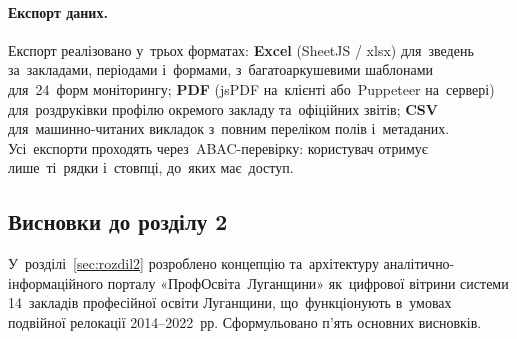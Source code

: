 \paragraph*{\textbf{Експорт даних.}}
\label{sec:p2-arch-export}

Експорт реалізовано у~трьох форматах: \textbf{Excel} (SheetJS / xlsx) для~зведень за~закладами, періодами і~формами, з~багатоаркушевими шаблонами для~24~форм моніторингу; \textbf{PDF} (jsPDF на~клієнті або~Puppeteer на~сервері) для~роздруківки профілю окремого закладу та~офіційних звітів; \textbf{CSV} для~машинно-читаних викладок з~повним переліком полів і~метаданих. Усі~експорти проходять через~ABAC-перевірку: користувач отримує лише~ті~рядки і~стовпці, до~яких має~доступ.

\subsection*{Висновки до розділу 2}

У~розділі~\ref{sec:rozdil2} розроблено концепцію та~архітектуру аналітично-інформаційного порталу «ПрофОсвіта~Луганщини» як~цифрової вітрини системи 14~закладів професійної освіти Луганщини, що~функціонують в~умовах подвійної релокації 2014--2022~рр. Сформульовано п'ять основних висновків.

